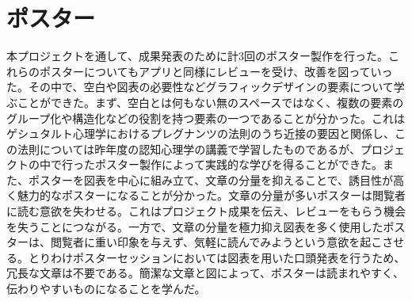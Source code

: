 \section{ポスター}
本プロジェクトを通して、成果発表のために計3回のポスター製作を行った。これらのポスターについてもアプリと同様にレビューを受け、改善を図っていった。その中で、空白や図表の必要性などグラフィックデザインの要素について学ぶことができた。まず、空白とは何もない無のスペースではなく、複数の要素のグループ化や構造化などの役割を持つ要素の一つであることが分かった。これはゲシュタルト心理学におけるプレグナンツの法則のうち近接の要因と関係し、この法則については昨年度の認知心理学の講義で学習したものであるが、プロジェクトの中で行ったポスター製作によって実践的な学びを得ることができた。また、ポスターを図表を中心に組み立て、文章の分量を抑えることで、誘目性が高く魅力的なポスターになることが分かった。文章の分量が多いポスターは閲覧者に読む意欲を失わせる。これはプロジェクト成果を伝え、レビューをもらう機会を失うことにつながる。一方で、文章の分量を極力抑え図表を多く使用したポスターは、閲覧者に重い印象を与えず、気軽に読んでみようという意欲を起こさせる。とりわけポスターセッションにおいては図表を用いた口頭発表を行うため、冗長な文章は不要である。簡潔な文章と図によって、ポスターは読まれやすく、伝わりやすいものになることを学んだ。
